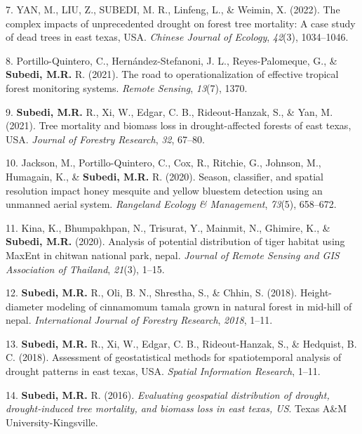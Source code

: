 \documentclass[11pt,a4paper,]{awesome-cv}
\newlength{\cslhangindent}
\newenvironment{CSLReferences}[2] %
 {\begin{list}{}{%
  \setlength{\itemindent}{0pt}
  \setlength{\leftmargin}{0pt}
  \setlength{\parsep}{0pt}
  \ifodd #1
   \setlength{\leftmargin}{\cslhangindent}
   \setlength{\itemindent}{-1\cslhangindent}
  \fi
  \setlength{\itemsep}{#2\baselineskip}}}
 {\end{list}}
\begin{document}
\begin{CSLReferences}{1}{0}
7. YAN, M., LIU, Z., SUBEDI, M. R., Linfeng, L., \& Weimin, X. (2022).
The complex impacts of unprecedented drought on forest tree mortality: A
case study of dead trees in east texas, USA. \emph{Chinese Journal of
Ecology}, \emph{42}(3), 1034--1046.

8. Portillo-Quintero, C., Hernández-Stefanoni, J. L., Reyes-Palomeque,
G., \& \textbf{Subedi, M.R.} R. (2021). The road to operationalization
of effective tropical forest monitoring systems. \emph{Remote Sensing},
\emph{13}(7), 1370.

9. \textbf{Subedi, M.R.} R., Xi, W., Edgar, C. B., Rideout-Hanzak, S.,
\& Yan, M. (2021). Tree mortality and biomass loss in drought-affected
forests of east texas, USA. \emph{Journal of Forestry Research},
\emph{32}, 67--80.

10. Jackson, M., Portillo-Quintero, C., Cox, R., Ritchie, G., Johnson,
M., Humagain, K., \& \textbf{Subedi, M.R.} R. (2020). Season,
classifier, and spatial resolution impact honey mesquite and yellow
bluestem detection using an unmanned aerial system. \emph{Rangeland
Ecology \& Management}, \emph{73}(5), 658--672.

11. Kina, K., Bhumpakhpan, N., Trisurat, Y., Mainmit, N., Ghimire, K.,
\& \textbf{Subedi, M.R.} (2020). Analysis of potential distribution of
tiger habitat using MaxEnt in chitwan national park, nepal.
\emph{Journal of Remote Sensing and GIS Association of Thailand},
\emph{21}(3), 1--15.

12. \textbf{Subedi, M.R.} R., Oli, B. N., Shrestha, S., \& Chhin, S.
(2018). Height-diameter modeling of cinnamomum tamala grown in natural
forest in mid-hill of nepal. \emph{International Journal of Forestry
Research}, \emph{2018}, 1--11.

13. \textbf{Subedi, M.R.} R., Xi, W., Edgar, C. B., Rideout-Hanzak, S.,
\& Hedquist, B. C. (2018). Assessment of geostatistical methods for
spatiotemporal analysis of drought patterns in east texas, USA.
\emph{Spatial Information Research}, 1--11.

14. \textbf{Subedi, M.R.} R. (2016). \emph{Evaluating geospatial
distribution of drought, drought-induced tree mortality, and biomass
loss in east texas, US}. Texas A\&M University-Kingsville.


\end{CSLReferences}
\end{document}
